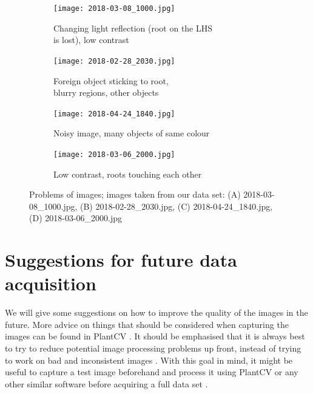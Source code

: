 \begin{figure}[H] 
	\begin{subfigure}[b]{0.5\linewidth}
		\centering
		\texttt{[image: 2018-03-08\_1000.jpg]} 
		\caption{Changing light reflection (root on the LHS\\ is lost), low contrast} 
		\label{figsub:reflection} 
		\vspace{4ex}
	\end{subfigure}%
	\begin{subfigure}[b]{0.5\linewidth}
		\centering
		\texttt{[image: 2018-02-28\_2030.jpg]} 
		\caption{Foreign object sticking to root, \\blurry regions, other objects} 
		\label{figsub:stickyObject} 
		\vspace{4ex}
	\end{subfigure} 
	\begin{subfigure}[b]{0.5\linewidth}
		\centering
		\texttt{[image: 2018-04-24\_1840.jpg]} 
		\caption{Noisy image, many objects of same colour} 
		\label{figsub:noisy} 
	\end{subfigure}%
	\begin{subfigure}[b]{0.5\linewidth}
		\centering
		\texttt{[image: 2018-03-06\_2000.jpg]} 
		\caption{Low contrast, roots touching each other} 
		\label{figsub:lowContrast} 
	\end{subfigure} 
	\caption{Problems of images; images taken from our data set: (A) 2018-03-08\_1000.jpg, (B) 2018-02-28\_2030.jpg, (C) 2018-04-24\_1840.jpg, (D) 2018-03-06\_2000.jpg}
	\label{fig:challenginRoots} 
\end{figure}


\section{Suggestions for future data acquisition}\label{futuredataAquis}

We will give some suggestions on how to improve the quality of the images in the future. More advice on things that should be considered when capturing the images can be found in PlantCV \cite{plantCV}. It should be emphasised that it is always best to try to reduce potential image processing problems up front, instead of trying to work on bad and inconsistent images \cite{plantCV}. With this goal in mind, it might be useful to capture a test image beforehand and process it using PlantCV \cite{plantCV} or any other similar software before acquiring a full data set \cite{plantCV}.   

